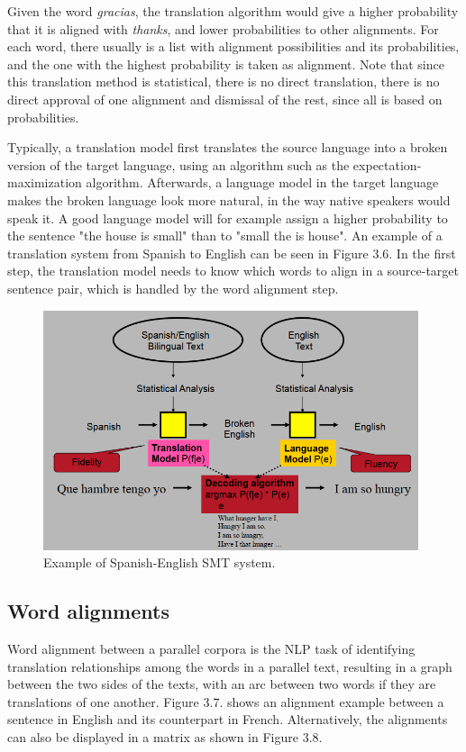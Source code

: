 Given the word \emph{gracias}, the translation algorithm would give a higher probability that it is aligned with \emph{thanks}, and lower probabilities to other alignments. For each word, there usually is a list with alignment possibilities and its probabilities, and the one with the highest probability is taken as alignment. Note that since this translation method is statistical, there is no direct translation, there is no direct approval of one alignment and dismissal of the rest, since all is based on probabilities.

Typically, a translation model first translates the source language into a broken version of the target language, using an algorithm such as the expectation-maximization algorithm. Afterwards, a language model in the target language makes the broken language look more natural, in the way native speakers would speak it. A good language model will for example assign a higher probability to the sentence "the house is small" than to "small the is house". An example of a translation system from Spanish to English can be seen in Figure  3.6. In the first step, the translation model needs to know which words to align in a source-target sentence pair, which is handled by the word alignment step.

\begin{figure}[!ht]
    \centering
    \includegraphics[width=11cm]{figures/smt.png}
    \caption{Example of Spanish-English SMT system.}
\end{figure}

\subsection{Word alignments}

Word alignment between a parallel corpora is the NLP task of identifying translation relationships among the words in a parallel text, resulting in a graph between the two sides of the texts, with an arc between two words if they are translations of one another. Figure 3.7. shows an alignment example between a sentence in English and its counterpart in French. Alternatively, the alignments can also be displayed in a matrix as shown in Figure 3.8.

